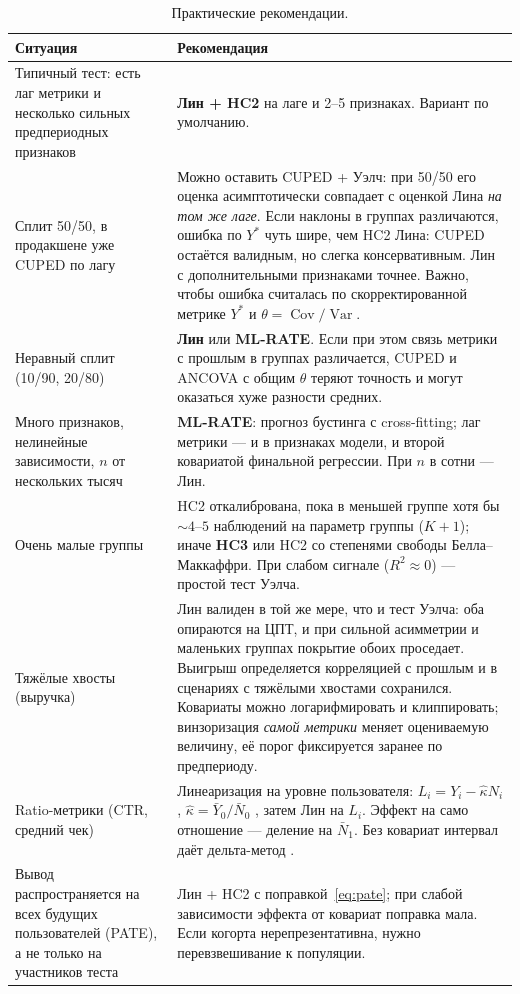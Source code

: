 \documentclass[10pt,a4paper]{article}
\newcommand{\Var}{\operatorname{Var}}
\newcommand{\Cov}{\operatorname{Cov}}
\begin{document}
\begin{table}[H]
\centering\small
\caption{Практические рекомендации.}\label{tab:guide}
\begin{tabularx}{\textwidth}{@{}>{\raggedright\arraybackslash}p{}>{\raggedright\arraybackslash}X@{}}
\toprule
Ситуация & Рекомендация \\
\midrule
Типичный тест: есть лаг метрики и несколько сильных предпериодных признаков &
\textbf{Лин + HC2} на лаге и 2--5 признаках. Вариант по умолчанию. \\
Сплит 50/50, в продакшене уже CUPED по лагу &
Можно оставить CUPED + Уэлч: при 50/50 его оценка асимптотически совпадает с оценкой Лина
\emph{на том же лаге}. Если наклоны в группах различаются, ошибка по $Y^*$ чуть шире, чем HC2 Лина:
CUPED остаётся валидным, но слегка консервативным. Лин с дополнительными признаками точнее.
Важно, чтобы ошибка считалась по скорректированной метрике $Y^*$ и $\theta=\Cov/\Var$. \\
Неравный сплит (10/90, 20/80) &
\textbf{Лин} или \textbf{ML-RATE}. Если при этом связь метрики с прошлым в группах различается,
CUPED и ANCOVA с общим $\theta$ теряют точность и могут оказаться хуже разности средних. \\
Много признаков, нелинейные зависимости, $n$ от нескольких тысяч &
\textbf{ML-RATE}: прогноз бустинга с cross-fitting; лаг метрики --- и в признаках модели, и второй
ковариатой финальной регрессии. При $n$ в сотни --- Лин. \\
Очень малые группы &
HC2 откалибрована, пока в меньшей группе хотя бы $\sim\!4$--$5$ наблюдений на параметр группы ($K+1$);
иначе \textbf{HC3} или HC2 со степенями свободы Белла--Маккаффри. При слабом сигнале ($R^2\approx0$) ---
простой тест Уэлча. \\
Тяжёлые хвосты (выручка) &
Лин валиден в той же мере, что и тест Уэлча: оба опираются на ЦПТ, и при сильной асимметрии и маленьких
группах покрытие обоих проседает. Выигрыш определяется корреляцией с прошлым и в сценариях с тяжёлыми
хвостами сохранился. Ковариаты можно логарифмировать и клиппировать; винзоризация \emph{самой метрики}
меняет оцениваемую величину, её порог фиксируется заранее по предпериоду. \\
Ratio-метрики (CTR, средний чек) &
Линеаризация на уровне пользователя: $L_i=Y_i-\hat\kappa N_i$, $\hat\kappa=\bar Y_0/\bar N_0$
\citep{budylin2018ratio}, затем Лин на $L_i$. Эффект на само отношение --- деление на $\bar N_1$.
Без ковариат интервал даёт дельта-метод \citep{deng2018delta}. \\
Вывод распространяется на всех будущих пользователей (PATE), а не только на участников теста &
Лин + HC2 с поправкой~\eqref{eq:pate}; при слабой зависимости эффекта от ковариат поправка мала.
Если когорта нерепрезентативна, нужно перевзвешивание к популяции. \\
\bottomrule
\end{tabularx}
\end{table}
\end{document}
